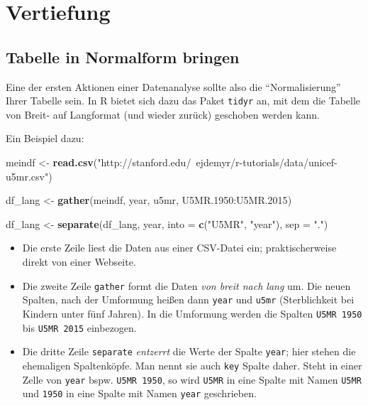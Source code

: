 \documentclass[12pt,ngerman,]{book}
\makeatletter
\newenvironment{Shaded}{\begin{snugshade}}{\end{snugshade}}
\newcommand{\KeywordTok}[1]{\textcolor[rgb]{0.13,0.29,0.53}{\textbf{{#1}}}}
\newcommand{\DataTypeTok}[1]{\textcolor[rgb]{0.13,0.29,0.53}{{#1}}}
\newcommand{\FloatTok}[1]{\textcolor[rgb]{0.00,0.00,0.81}{{#1}}}
\newcommand{\StringTok}[1]{\textcolor[rgb]{0.31,0.60,0.02}{{#1}}}
\newcommand{\NormalTok}[1]{{#1}}
\providecommand{\tightlist}{%
  \setlength{\itemsep}{0pt}\setlength{\parskip}{0pt}}
\newenvironment{kframe}{%
\medskip{}
\setlength{\fboxsep}{.8em}
 \def\at@end@of@kframe{}%
 \ifinner\ifhmode%
  \def\at@end@of@kframe{\end{minipage}}%
  \begin{minipage}{\columnwidth}%
 \fi\fi%
 \def\FrameCommand##1{\hskip\@totalleftmargin \hskip-\fboxsep
 \colorbox{shadecolor}{##1}\hskip-\fboxsep
     \hskip-\linewidth \hskip-\@totalleftmargin \hskip\columnwidth}%
 \MakeFramed {\advance\hsize-\width
   \@totalleftmargin\z@ \linewidth\hsize
   \@setminipage}}%
 {\par\unskip\endMakeFramed%
 \at@end@of@kframe}
\renewenvironment{Shaded}{\begin{kframe}}{\end{kframe}}
\makeatother
\begin{document}
\section{Vertiefung}\label{vertiefung}

\subsection{Tabelle in Normalform
bringen}\label{tabelle-in-normalform-bringen}

Eine der ersten Aktionen einer Datenanalyse sollte also die
``Normalisierung'' Ihrer Tabelle sein. In R bietet sich dazu das Paket
\texttt{tidyr} an, mit dem die Tabelle von Breit- auf Langformat (und
wieder zurück) geschoben werden kann.

Ein Beispiel dazu:

\begin{Shaded}
\begin{Highlighting}[]
\NormalTok{meindf <-}\StringTok{ }\KeywordTok{read.csv}\NormalTok{(}\StringTok{"http://stanford.edu/~ejdemyr/r-tutorials/data/unicef-u5mr.csv"}\NormalTok{)}

\NormalTok{df_lang <-}\StringTok{ }\KeywordTok{gather}\NormalTok{(meindf, year, u5mr, U5MR}\FloatTok{.1950}\NormalTok{:U5MR}\FloatTok{.2015}\NormalTok{)}

\NormalTok{df_lang <-}\StringTok{ }\KeywordTok{separate}\NormalTok{(df_lang, year, }\DataTypeTok{into =} \KeywordTok{c}\NormalTok{(}\StringTok{"U5MR"}\NormalTok{, }\StringTok{"year"}\NormalTok{), }\DataTypeTok{sep =} \StringTok{"."}\NormalTok{)}
\end{Highlighting}
\end{Shaded}

\begin{itemize}
\tightlist
\item
  Die erste Zeile liest die Daten aus einer CSV-Datei ein;
  praktischerweise direkt von einer Webseite.\\
\item
  Die zweite Zeile \texttt{gather} formt die Daten \emph{von breit nach
  lang} um. Die neuen Spalten, nach der Umformung heißen dann
  \texttt{year} und \texttt{u5mr} (Sterblichkeit bei Kindern unter fünf
  Jahren). In die Umformung werden die Spalten \texttt{U5MR\ 1950} bis
  \texttt{U5MR\ 2015} einbezogen.
\item
  Die dritte Zeile \texttt{separate} \emph{entzerrt} die Werte der
  Spalte \texttt{year}; hier stehen die ehemaligen Spaltenköpfe. Man
  nennt sie auch \texttt{key} Spalte daher. Steht in einer Zelle von
  \texttt{year} bspw. \texttt{U5MR\ 1950}, so wird \texttt{U5MR} in eine
  Spalte mit Namen \texttt{U5MR} und \texttt{1950} in eine Spalte mit
  Namen \texttt{year} geschrieben.
\end{itemize}
\end{document}
